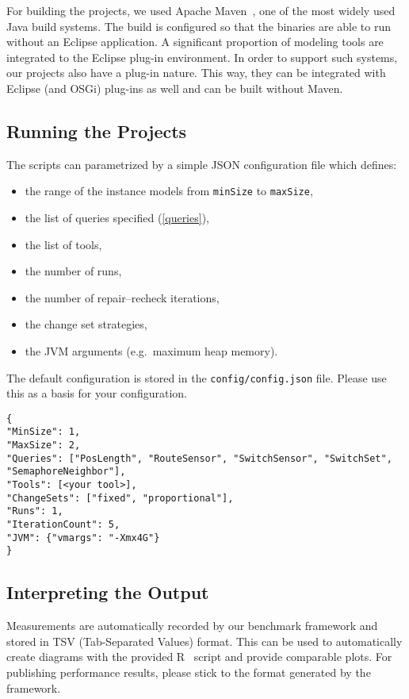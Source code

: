 \documentclass[submission,copyright,creativecommons]{eptcs}
\begin{document}
For building the projects, we used Apache Maven~\cite{Maven}, one of the most widely used Java build systems. The build is configured so that the binaries are able to run without an Eclipse application. A significant proportion of modeling tools are integrated to the Eclipse plug-in environment. In order to support such systems, our projects also have a plug-in nature. This way, they can be integrated with Eclipse (and OSGi) plug-ins as well and can be built without Maven.

\subsection{Running the Projects}

The scripts can parametrized by a simple JSON configuration file which defines:

\begin{itemize}
	\item the range of the instance models from \texttt{minSize} to \texttt{maxSize},
	\item the list of queries specified (\autoref{queries}),
	\item the list of tools,
	\item the number of runs,
	\item the number of repair--recheck iterations,
	\item the change set strategies,
	\item the JVM arguments (e.g.\ maximum heap memory).
\end{itemize}

The default configuration is stored in the \texttt{config/config.json} file. Please use this as a basis for your configuration.

\begin{lstlisting}
{
"MinSize": 1,
"MaxSize": 2,
"Queries": ["PosLength", "RouteSensor", "SwitchSensor", "SwitchSet", "SemaphoreNeighbor"],
"Tools": [<your tool>],
"ChangeSets": ["fixed", "proportional"],
"Runs": 1,
"IterationCount": 5,
"JVM": {"vmargs": "-Xmx4G"}
}
\end{lstlisting}

\subsection{Interpreting the Output}

Measurements are automatically recorded by our benchmark framework and stored in TSV (Tab-Separated Values) format. This can be used to automatically create diagrams with the provided R~\cite{RProject} script and provide comparable plots. For publishing performance results, please stick to the format generated by the framework.
\end{document}
